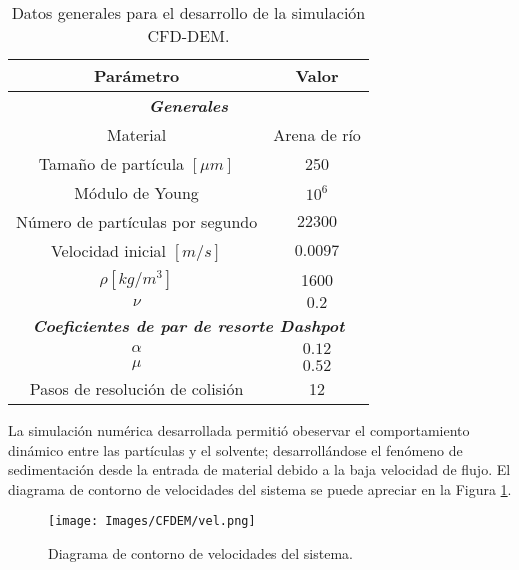 \begin{table}[h!]
	\centering
	\begin{adjustbox}{max width = 0.45\textwidth}
	\begin{tabular}{|c|c|}
		\hline
		\textbf{Par\'ametro} & \textbf{Valor} \\ \hline
		\multicolumn{2}{|c|}{\textbf{\textit{Generales}}} \\ \hline
		Material & Arena de r\'io \\ \hline
		Tama\~no de part\'icula $[\mu m]$ & 250 \\ \hline
		M\'odulo de Young & $10 ^6$ \\ \hline
		 N\'umero de part\'iculas por segundo & $22300$ \\
		  \hline
		 Velocidad inicial $[m / s]$ & $0.0097$ \\ \hline
		 $\rho [kg/m^3]$ & 1600 \\ \hline
		 $\nu$ & $0.2$ \\ \hline
		 \multicolumn{2}{|c|}{\textbf{\textit{Coeficientes de par de resorte Dashpot}}} \\ \hline
		 $\alpha$ & $0.12$ \\ \hline
		 $\mu$ & $0.52$ \\ \hline
		 Pasos de resoluci\'on de colisi\'on & 12 \\ \hline
	\end{tabular}
	\end{adjustbox}
	\caption{Datos generales para el desarrollo de la simulaci\'on CFD-DEM.}
	\label{CFDEMdata}
\end{table}

\vspace{-0.8cm}

\noindent
\justify

La simulaci\'on num\'erica desarrollada permiti\'o obeservar el comportamiento din\'amico entre las part\'iculas y el solvente; desarroll\'andose el fen\'omeno de sedimentaci\'on desde la entrada de material debido a la baja velocidad de flujo. El diagrama de contorno de velocidades del sistema se puede apreciar en la Figura \ref{CFDEM:vel}.

\begin{figure}[h!]
	\centering
	\texttt{[image: Images/CFDEM/vel.png]}
	\caption{Diagrama de contorno de velocidades del sistema.}
	\label{CFDEM:vel}
\end{figure}

\newpage

\noindent
\justify

